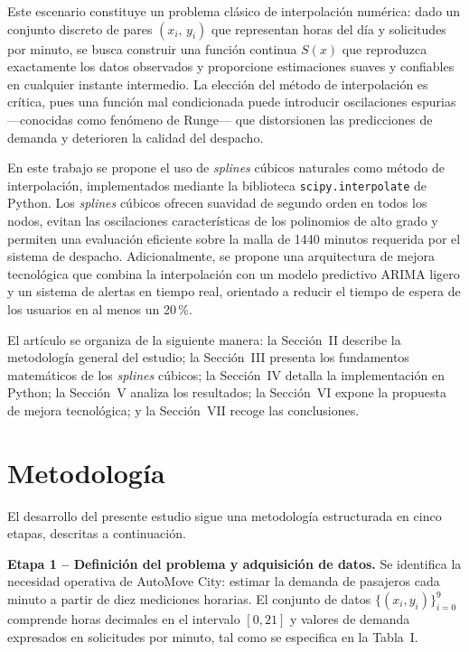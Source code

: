 \documentclass[conference]{IEEEtran}
\begin{document}
Este escenario constituye un problema clásico de interpolación numérica: dado un conjunto discreto de pares $(x_i,\, y_i)$ que representan horas del día y
solicitudes por minuto, se busca construir una función continua $S(x)$ que reproduzca exactamente los datos observados y proporcione estimaciones suaves y
confiables en cualquier instante intermedio. La elección del método de interpolación es crítica, pues una función mal condicionada puede introducir
oscilaciones espurias —conocidas como fenómeno de Runge— que distorsionen las predicciones de demanda y deterioren la calidad del despacho.

En este trabajo se propone el uso de \textit{splines} cúbicos naturales como método de interpolación, implementados mediante la biblioteca
\texttt{scipy.interpolate} de Python. Los \textit{splines} cúbicos ofrecen suavidad de segundo orden en todos los nodos, evitan las oscilaciones
características de los polinomios de alto grado y permiten una evaluación eficiente sobre la malla de 1440 minutos requerida por el sistema de despacho.
Adicionalmente, se propone una arquitectura de mejora tecnológica que combina la interpolación con un modelo predictivo ARIMA ligero y un sistema de
alertas en tiempo real, orientado a reducir el tiempo de espera de los usuarios en al menos un 20\,\%.

El artículo se organiza de la siguiente manera: la Sección~II describe la metodología general del estudio; la Sección~III presenta los fundamentos
matemáticos de los \textit{splines} cúbicos; la Sección~IV detalla la implementación en Python; la Sección~V analiza los resultados; la Sección~VI expone
la propuesta de mejora tecnológica; y la Sección~VII recoge las conclusiones.

\section{Metodología}

El desarrollo del presente estudio sigue una metodología estructurada en cinco etapas, descritas a continuación.

\textbf{Etapa 1 – Definición del problema y adquisición de datos.} Se identifica la necesidad operativa de AutoMove City: estimar la demanda de pasajeros
cada minuto a partir de diez mediciones horarias. El conjunto de datos $\{(x_i, y_i)\}_{i=0}^{9}$ comprende horas decimales en el intervalo $[0, 21]$ y
valores de demanda expresados en solicitudes por minuto, tal como se especifica en la Tabla~I.
\end{document}
